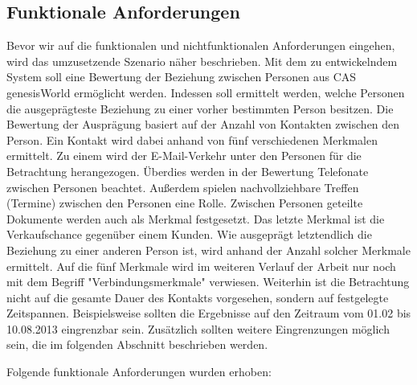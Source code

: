 \subsection{Funktionale Anforderungen}

Bevor wir auf die funktionalen und nichtfunktionalen Anforderungen eingehen, wird das umzusetzende Szenario näher beschrieben. Mit dem zu entwickelndem System soll eine Bewertung der Beziehung zwischen Personen aus CAS genesisWorld ermöglicht werden. Indessen soll ermittelt werden, welche Personen die ausgeprägteste Beziehung zu einer vorher bestimmten Person besitzen. Die Bewertung der Ausprägung basiert auf der Anzahl von Kontakten zwischen den Person. Ein Kontakt wird dabei anhand von fünf verschiedenen Merkmalen ermittelt. Zu einem wird der E-Mail-Verkehr unter den Personen für die Betrachtung herangezogen. Überdies werden in der Bewertung Telefonate zwischen Personen beachtet. Außerdem spielen nachvollziehbare Treffen (Termine) zwischen den Personen eine Rolle. Zwischen Personen geteilte Dokumente werden auch als Merkmal festgesetzt. Das letzte Merkmal ist die Verkaufschance gegenüber einem Kunden. Wie ausgeprägt letztendlich die Beziehung zu einer anderen Person ist, wird anhand der Anzahl solcher Merkmale ermittelt. Auf die fünf Merkmale wird im weiteren Verlauf der Arbeit nur noch mit dem Begriff "Verbindungsmerkmale" verwiesen. Weiterhin ist die Betrachtung nicht auf die gesamte Dauer des Kontakts vorgesehen, sondern auf festgelegte Zeitspannen. Beispielsweise sollten die Ergebnisse auf den Zeitraum vom 01.02 bis 10.08.2013 eingrenzbar sein. Zusätzlich sollten weitere Eingrenzungen möglich sein, die im folgenden Abschnitt beschrieben werden.

Folgende funktionale Anforderungen wurden erhoben:

